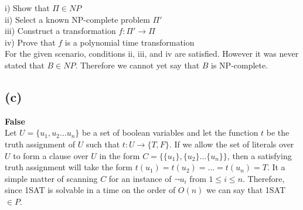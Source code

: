 		\noindent
		i) Show that $\Pi \in NP$\\
		ii) Select a known NP-complete problem $\Pi'$\\
		iii) Construct a transformation $f: \Pi' \rightarrow \Pi$\\
		iv) Prove that $f$ is a polynomial time transformation\\
		
		\noindent
		For the given scenario, conditions ii, iii, and iv are satisfied. 
		However it was never stated that $B \in NP$. Therefore we cannot yet say that $B$ is NP-complete. 
		
	\subsection*{(c)}
		\textbf{False}\\
		Let $U = \{u_1, u_2 \dots u_n\}$ be a set of boolean variables and let the function $t$ be the truth assignment of $U$ such that $t:U\rightarrow\{T,F\}$. 
		If we allow the set of literals over $U$ to form a clause over $U$ in the form $C = \{\{u_1\}, \{u_2\} \dots \{u_n\}\}$, then a satisfying truth assignment will take the form $t(u_1) = t(u_2)= \dots = t(u_n) = T$. 
		It a simple matter of scanning $C$ for an instance of $\neg u_i$ from $1\leq i \leq n$. 
		Therefore, since 1SAT is solvable in a time on the order of $O(n)$ we can say that 1SAT $\in P$.